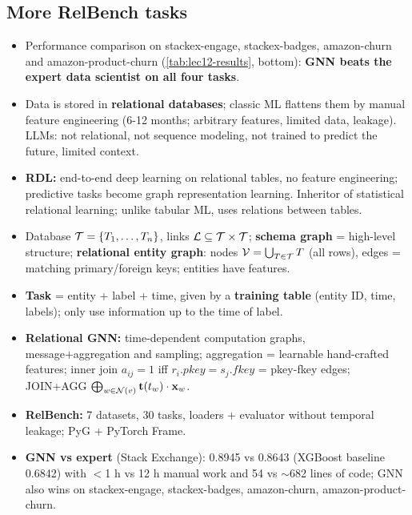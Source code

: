 \subsection{More RelBench tasks}\label{sec:lec12-more}

\begin{itemize}
  \item Performance comparison on stackex-engage, stackex-badges, amazon-churn and
    amazon-product-churn (\cref{tab:lec12-results}, bottom): \textbf{GNN beats the expert
    data scientist on all four tasks}.
\end{itemize}

\bigskip{}
{}
\begin{summarybox}
  \begin{itemize}
    \item Data is stored in \textbf{relational databases}; classic ML flattens them
      by manual feature engineering (6-12 months; arbitrary features, limited data,
      leakage). LLMs: not relational, not sequence modeling, not trained to predict the
      future, limited context.
    \item \textbf{RDL:} end-to-end deep learning on relational tables, no feature
      engineering; predictive tasks become graph representation learning. Inheritor of
      statistical relational learning; unlike tabular ML, uses relations between tables.
    \item Database $\mathcal{T}=\{T_1,\dots,T_n\}$, links $\mathcal{L}\subseteq\mathcal{T}\times\mathcal{T}$;
      \textbf{schema graph} = high-level structure; \textbf{relational entity graph}:
      nodes $\mathcal{V}=\bigcup_{T\in\mathcal{T}}T$ (all rows), edges = matching primary/foreign
      keys; entities have features.
    \item \textbf{Task} = entity + label + time, given by a \textbf{training table} (entity
      ID, time, labels); only use information up to the time of label.
    \item \textbf{Relational GNN:} time-dependent computation graphs, message+aggregation
      and sampling; aggregation = learnable hand-crafted features; inner join
      $a_{ij}=1$ iff $r_i.pkey=s_j.fkey$ = pkey-fkey edges; JOIN+AGG
      $\bigoplus_{w\in\mathcal{N}(v)}\mathbf{t}(t_w)\cdot\mathbf{x}_w$.
    \item \textbf{RelBench:} 7 datasets, 30 tasks, loaders + evaluator without temporal
      leakage; PyG + PyTorch Frame.
    \item \textbf{GNN vs expert} (Stack Exchange): 0.8945 vs 0.8643 (XGBoost baseline
      0.6842) with $<$1 h vs 12 h manual work and 54 vs $\sim$682 lines of code; GNN also
      wins on stackex-engage, stackex-badges, amazon-churn, amazon-product-churn.
  \end{itemize}
\end{summarybox}
